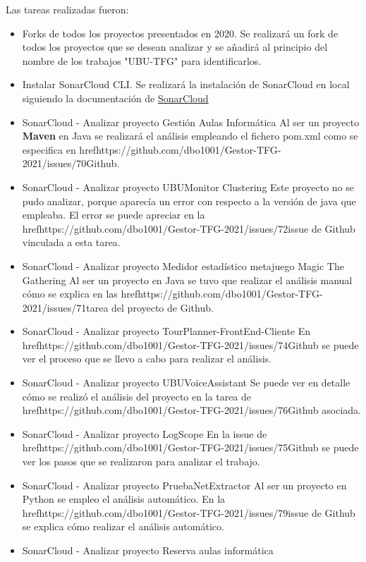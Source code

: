 Las tareas realizadas fueron:
\begin{itemize}
	\tightlist
	\item Forks de todos los proyectos presentados en 2020.
		Se realizará un fork de todos los proyectos que se desean analizar y se añadirá al principio del nombre de los trabajos "UBU-TFG" para identificarlos. 
	\item Instalar SonarCloud CLI.
		Se realizará la instalación de SonarCloud en local siguiendo la documentación de \href{https://sonarcloud.io/documentation/analysis/scan/sonarscanner/}{SonarCloud} 
	\item SonarCloud - Analizar proyecto Gestión Aulas Informática
		Al ser un proyecto \textbf{Maven} en Java se realizará el análisis empleando el fichero pom.xml como se especifica en href{https://github.com/dbo1001/Gestor-TFG-2021/issues/70}{Github}.
	\item SonarCloud - Analizar proyecto UBUMonitor Clustering
		Este proyecto no se pudo analizar, porque aparecía un error con respecto a la versión de java que empleaba. El error se puede apreciar en la href{https://github.com/dbo1001/Gestor-TFG-2021/issues/72}{issue de Github} vinculada a esta tarea. 
	\item SonarCloud - Analizar proyecto Medidor estadístico metajuego Magic The Gathering
		Al ser un proyecto en Java se tuvo que realizar el análisis manual cómo se explica en las href{https://github.com/dbo1001/Gestor-TFG-2021/issues/71}{tarea del proyecto de Github}.
	\item SonarCloud - Analizar proyecto TourPlanner-FrontEnd-Cliente
		En href{https://github.com/dbo1001/Gestor-TFG-2021/issues/74}{Github} se puede ver el proceso que se llevo a cabo para realizar el análisis.
	\item SonarCloud - Analizar proyecto UBUVoiceAssistant
		Se puede ver en detalle cómo se realizó el análisis del proyecto en la tarea de href{https://github.com/dbo1001/Gestor-TFG-2021/issues/76}{Github} asociada.
	\item SonarCloud - Analizar proyecto LogScope
		En la issue de href{https://github.com/dbo1001/Gestor-TFG-2021/issues/75}{Github} se puede ver los pasos que se realizaron para analizar el trabajo.
	\item SonarCloud - Analizar proyecto PruebaNetExtractor
		Al ser un proyecto en Python se empleo el análisis automático. En la href{https://github.com/dbo1001/Gestor-TFG-2021/issues/79}{issue de Github} se explica cómo realizar el análisis automático.
	\item SonarCloud - Analizar proyecto Reserva aulas informática

\end{itemize}
